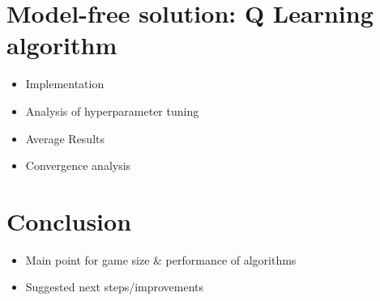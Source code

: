 \section{Model-free solution: Q Learning algorithm}

\begin{itemize}
\item Implementation
\item Analysis of hyperparameter tuning 
\item Average Results
\item Convergence analysis
\end{itemize}

\section{Conclusion}

\begin{itemize}
\item Main point for game size \& performance of algorithms
\item Suggested next steps/improvements
\end{itemize}












